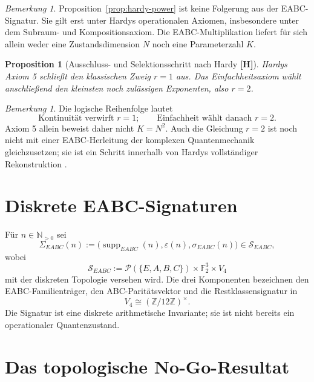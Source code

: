 \documentclass[11pt,a4paper,reqno]{amsart}
\newtheorem{proposition}[theorem]{Proposition}
\theoremstyle{definition}
\theoremstyle{remark}
\newtheorem{remark}[theorem]{Bemerkung}
\newcommand{\N}{\mathbb{N}}
\newcommand{\ZZ}{\mathbb{Z}}
\newcommand{\FF}{\mathbb{F}}
\newcommand{\Supp}{\operatorname{supp}}
\newcommand{\SEABC}{\mathcal{S}_{EABC}}
\newcommand{\StatusH}{\textnormal{\textbf{[H]}}}
\begin{document}
\begin{remark}
Proposition~\ref{prop:hardy-power} ist keine Folgerung aus der EABC-Signatur. Sie gilt erst unter Hardys operationalen Axiomen, insbesondere unter dem Subraum- und Kompositionsaxiom. Die EABC-Multiplikation liefert für sich allein weder eine Zustandsdimension $N$ noch eine Parameterzahl $K$.
\end{remark}

\begin{proposition}[Ausschluss- und Selektionsschritt nach Hardy \StatusH]
\label{prop:hardy-selection}
Hardys Axiom 5 schließt den klassischen Zweig $r=1$ aus. Das Einfachheitsaxiom wählt anschließend den kleinsten noch zulässigen Exponenten, also $r=2$.
\end{proposition}

\begin{remark}
Die logische Reihenfolge lautet
\begin{equation}
\boxed{
\text{Kontinuität verwirft }r=1;
\qquad
\text{Einfachheit wählt danach }r=2.
}
\end{equation}
Axiom 5 allein beweist daher nicht $K=N^2$. Auch die Gleichung $r=2$ ist noch nicht mit einer EABC-Herleitung der komplexen Quantenmechanik gleichzusetzen; sie ist ein Schritt innerhalb von Hardys vollständiger Rekonstruktion \cite{Hardy2001}.
\end{remark}

\section{Diskrete EABC-Signaturen}

Für $n\in\N_{>0}$ sei
\begin{equation}
\Sigma_{EABC}(n)
:=
\bigl(
\Supp_{EABC}(n),\varepsilon(n),\sigma_{EABC}(n)
\bigr)
\in\SEABC,
\end{equation}
wobei
\begin{equation}
\SEABC
:=
\mathcal P(\{E,A,B,C\})\times\FF_2^3\times V_4
\end{equation}
mit der diskreten Topologie versehen wird. Die drei Komponenten bezeichnen den EABC-Familienträger, den ABC-Paritätsvektor und die Restklassensignatur in
\begin{equation}
V_4\cong (\ZZ/12\ZZ)^\times.
\end{equation}
Die Signatur ist eine diskrete arithmetische Invariante; sie ist nicht bereits ein operationaler Quantenzustand.

\section{Das topologische No-Go-Resultat}
\end{document}

